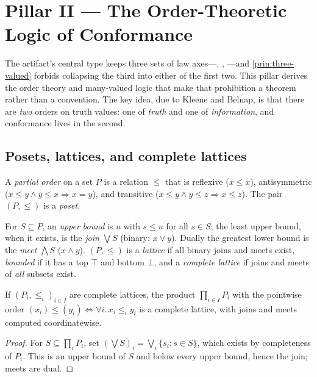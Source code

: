 \section{Pillar II --- The Order-Theoretic Logic of Conformance}
\label{sec:order}

The artifact's central type keeps three sets of law axes---\admitted, ,
\unknownstat---and \cref{prin:three-valued} forbids collapsing the third into
either of the first two. This pillar derives the order theory and many-valued
logic that make that prohibition a theorem rather than a convention. The key idea,
due to Kleene and Belnap, is that there are \emph{two} orders on truth values: one
of \emph{truth} and one of \emph{information}, and conformance lives in the
second.

\subsection{Posets, lattices, and complete lattices}
\label{sec:order-lattice}

\begin{definition}
A \emph{partial order} on a set $P$ is a relation $\le$ that is reflexive
($x\le x$), antisymmetric ($x\le y\wedge y\le x\Rightarrow x=y$), and transitive
($x\le y\wedge y\le z\Rightarrow x\le z$). The pair $(P,\le)$ is a \emph{poset}.
\end{definition}

\begin{definition}
For $S\subseteq P$, an \emph{upper bound} is $u$ with $s\le u$ for all $s\in S$;
the least upper bound, when it exists, is the \emph{join} $\bigvee S$ (binary:
$x\vee y$). Dually the greatest lower bound is the \emph{meet} $\bigwedge S$
($x\wedge y$). $(P,\le)$ is a \emph{lattice} if all binary joins and meets exist,
\emph{bounded} if it has a top $\top$ and bottom $\bot$, and a \emph{complete
lattice} if joins and meets of \emph{all} subsets exist.
\end{definition}

\begin{lemma}
\label{lem:product-lattice}
If $(P_i,\le_i)_{i\in I}$ are complete lattices, the product
$\prod_{i\in I}P_i$ with the pointwise order
$(x_i)\le(y_i)\iff\forall i.\,x_i\le_i y_i$ is a complete lattice, with joins and
meets computed coordinatewise.
\end{lemma}
\begin{proof}
For $S\subseteq\prod_i P_i$, set $(\bigvee S)_i=\bigvee_i\{s_i:s\in S\}$, which
exists by completeness of $P_i$. This is an upper bound of $S$ and below every
upper bound, hence the join; meets are dual.
\end{proof}

